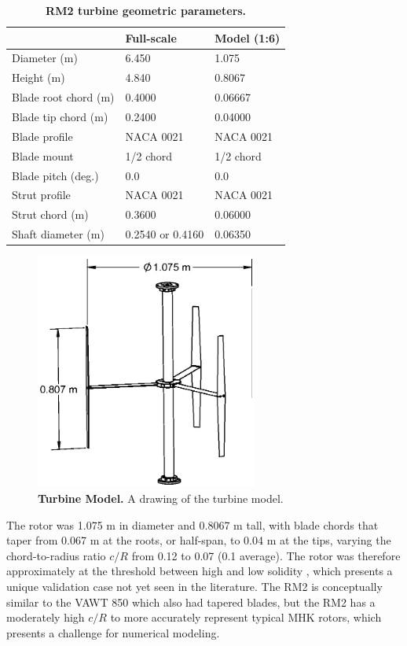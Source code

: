 \documentclass[10pt,letterpaper]{article}
\begin{document}
\begin{table}[ht]
\centering
\begin{tabular}{l|l|l}
   & Full-scale & Model (1:6) \\
\hline
Diameter (m)   & 6.450 & 1.075 \\
Height (m)     & 4.840 & 0.8067 \\
Blade root chord (m) & 0.4000 & 0.06667 \\
Blade tip chord (m)  & 0.2400 & 0.04000 \\
Blade profile & NACA 0021 & NACA 0021 \\
Blade mount & 1/2 chord & 1/2 chord \\
Blade pitch (deg.) & 0.0 & 0.0 \\
Strut profile & NACA 0021 & NACA 0021 \\
Strut chord (m) & 0.3600 & 0.06000 \\
Shaft diameter (m) & 0.2540 \cite{Beam2011} or 0.4160 \cite{Hill2014} & 0.06350\\
\end{tabular}
\caption{\textbf{RM2 turbine geometric parameters.}}
\label{tab:turb-geom}
\end{table}

\begin{figure}[h]
    \includegraphics[width=0.65\textwidth]{figures/turbine.eps}

    \caption{{\bf Turbine Model.} A drawing of the turbine model.}

    \label{fig:turbine-drawing}
\end{figure}

The rotor was 1.075 m in diameter and 0.8067 m tall, with blade chords that
taper from 0.067 m at the roots, or half-span, to 0.04 m at the tips, varying
the chord-to-radius ratio $c/R$ from 0.12 to 0.07 (0.1 average). The rotor was
therefore approximately at the threshold between high and low solidity
\cite{Strickland1981,Fiedler2009}, which presents a unique validation case not
yet seen in the literature. The RM2 is conceptually similar to the VAWT 850
\cite{Mays1990} which also had tapered blades, but the RM2 has a moderately high
$c/R$ to more accurately represent typical MHK rotors, which presents a
challenge for numerical modeling.
\end{document}
